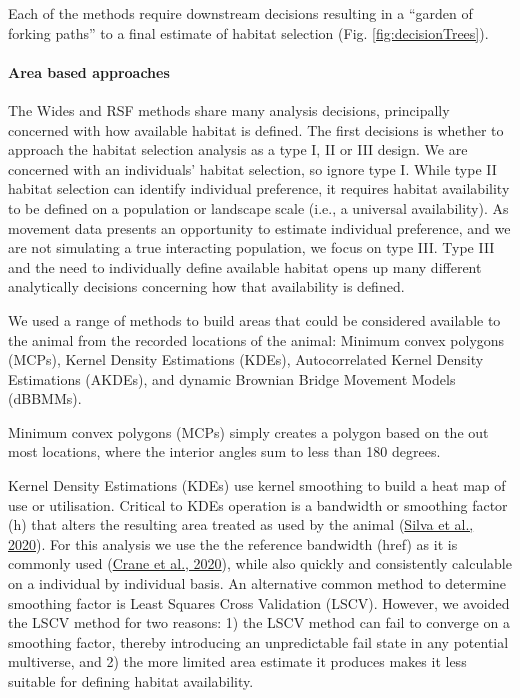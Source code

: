 \documentclass[10pt,a4paper]{article}
\begin{document}
Each of the methods require downstream decisions resulting in a ``garden of forking paths'' to a final estimate of habitat selection (Fig. \ref{fig:decisionTrees}).

\hypertarget{area-based-approaches}{%
\paragraph{Area based approaches}\label{area-based-approaches}}

The Wides and RSF methods share many analysis decisions, principally concerned with how available habitat is defined.
The first decisions is whether to approach the habitat selection analysis as a type I, II or III design.
We are concerned with an individuals' habitat selection, so ignore type I.
While type II habitat selection can identify individual preference, it requires habitat availability to be defined on a population or landscape scale (i.e., a universal availability).
As movement data presents an opportunity to estimate individual preference, and we are not simulating a true interacting population, we focus on type III.
Type III and the need to individually define available habitat opens up many different analytically decisions concerning how that availability is defined.

We used a range of methods to build areas that could be considered available to the animal from the recorded locations of the animal: Minimum convex polygons (MCPs), Kernel Density Estimations (KDEs), Autocorrelated Kernel Density Estimations (AKDEs), and dynamic Brownian Bridge Movement Models (dBBMMs).

Minimum convex polygons (MCPs) simply creates a polygon based on the out most locations, where the interior angles sum to less than 180 degrees.

Kernel Density Estimations (KDEs) use kernel smoothing to build a heat map of use or utilisation.
Critical to KDEs operation is a bandwidth or smoothing factor (h) that alters the resulting area treated as used by the animal (\protect\hyperlink{ref-silva_reptiles_2020}{Silva et al., 2020}).
For this analysis we use the the reference bandwidth (href) as it is commonly used (\protect\hyperlink{ref-crane_lots_2020}{Crane et al., 2020}), while also quickly and consistently calculable on a individual by individual basis.
An alternative common method to determine smoothing factor is Least Squares Cross Validation (LSCV).
However, we avoided the LSCV method for two reasons: 1) the LSCV method can fail to converge on a smoothing factor, thereby introducing an unpredictable fail state in any potential multiverse, and 2) the more limited area estimate it produces makes it less suitable for defining habitat availability.
\end{document}
